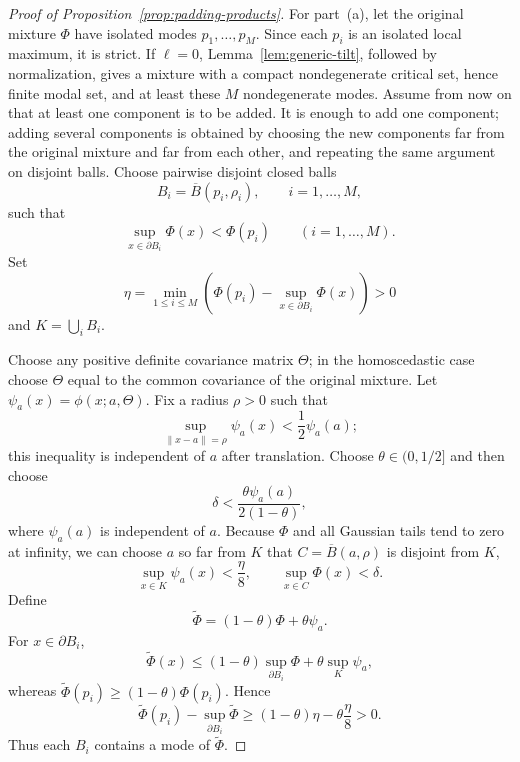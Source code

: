\documentclass[11pt]{article}
\theoremstyle{plain}
\theoremstyle{definition}
\theoremstyle{remark}
\numberwithin{equation}{section}
\begin{document}
\begin{proof}[Proof of Proposition~\ref{prop:padding-products}]
For part~(a), let the original mixture $\Phi$ have isolated modes $p_1,\dots,p_M$. Since each $p_i$ is an isolated local maximum, it is strict. If $\ell=0$, Lemma~\ref{lem:generic-tilt}, followed by normalization, gives a mixture with a compact nondegenerate critical set, hence finite modal set, and at least these $M$ nondegenerate modes. Assume from now on that at least one component is to be added. It is enough to add one component; adding several components is obtained by choosing the new components far from the original mixture and far from each other, and repeating the same argument on disjoint balls. Choose pairwise disjoint closed balls
\[
B_i=\overline B(p_i,\rho_i),\qquad i=1,\dots,M,
\]
such that
\[
\sup_{x\in \partial B_i}\Phi(x)<\Phi(p_i)
\qquad (i=1,\dots,M).
\]
Set
\[
\eta=\min_{1\le i\le M}\left(\Phi(p_i)-\sup_{x\in\partial B_i}\Phi(x)\right)>0
\]
and $K=\bigcup_iB_i$.

Choose any positive definite covariance matrix $\Theta$; in the homoscedastic case choose $\Theta$ equal to the common covariance of the original mixture. Let $\psi_a(x)=\phi(x;a,\Theta)$. Fix a radius $\rho>0$ such that
\[
\sup_{\|x-a\|=\rho}\psi_a(x)<\frac12\psi_a(a);
\]
this inequality is independent of $a$ after translation. Choose $\theta\in(0,1/2]$ and then choose
\[
\delta<\frac{\theta\psi_a(a)}{2(1-\theta)},
\]
where $\psi_a(a)$ is independent of $a$. Because $\Phi$ and all Gaussian tails tend to zero at infinity, we can choose $a$ so far from $K$ that $C=\overline B(a,\rho)$ is disjoint from $K$,
\[
\sup_{x\in K}\psi_a(x)<\frac{\eta}{8},
\qquad
\sup_{x\in C}\Phi(x)<\delta.
\]
Define
\[
\widetilde\Phi=(1-\theta)\Phi+\theta\psi_a.
\]
For $x\in\partial B_i$,
\[
\widetilde\Phi(x)\le (1-\theta)\sup_{\partial B_i}\Phi+\theta\sup_K\psi_a,
\]
whereas $\widetilde\Phi(p_i)\ge (1-\theta)\Phi(p_i)$. Hence
\[
\widetilde\Phi(p_i)-\sup_{\partial B_i}\widetilde\Phi
\ge (1-\theta)\eta-\theta\frac{\eta}{8}>0.
\]
Thus each $B_i$ contains a mode of $\widetilde\Phi$.


\end{proof}
\end{document}
